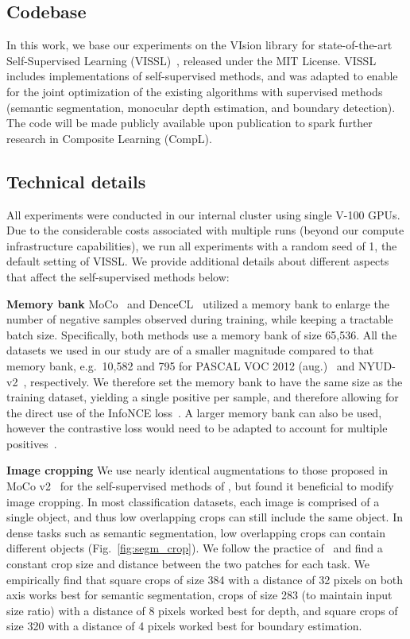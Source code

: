 \documentclass[10pt,twocolumn,letterpaper]{article}
\newcommand{\parsection}[1]{\vspace{1mm}\noindent\textbf{#1 }}
\begin{document}
\subsection{Codebase}
In this work, we base our experiments on the VIsion library for state-of-the-art Self-Supervised Learning (VISSL)~\cite{goyal2021vissl}, released under the MIT License. VISSL includes implementations of self-supervised methods, and was adapted to enable for the joint optimization of the existing algorithms with supervised methods (semantic segmentation, monocular depth estimation, and boundary detection). The code will be made publicly available upon publication to spark further research in Composite Learning (CompL). 

\subsection{Technical details}

All experiments were conducted in our internal cluster using single V-100 GPUs. Due to the considerable costs associated with multiple runs (beyond our compute infrastructure capabilities), we run all experiments with a random seed of 1, the default setting of VISSL. We provide additional details about different aspects that affect the self-supervised methods below:

\parsection{Memory bank}
MoCo~\cite{he2020momentum} and DenceCL~\cite{wang2020dense} utilized a memory bank to enlarge the number of negative samples observed during training, while keeping a tractable batch size. Specifically, both methods use a memory bank of size 65,536. All the datasets we used in our study are of a smaller magnitude compared to that memory bank, e.g.\ 10,582 and 795 for PASCAL VOC 2012 (aug.)~\cite{hariharan2011semantic} and NYUD-v2~\cite{silberman2012indoor}, respectively. We therefore set the memory bank to have the same size as the training dataset, yielding a single positive per sample, and therefore allowing for the direct use of the InfoNCE loss~\cite{oord2018representation}. A larger memory bank can also be used, however the contrastive loss would need to be adapted to account for multiple positives~\cite{khosla2020supervised}.

\parsection{Image cropping}
We use nearly identical augmentations to those proposed in MoCo v2~\cite{chen2020improved} for the self-supervised methods of \cite{he2020momentum,wang2020dense}, but found it beneficial to modify image cropping. In most classification datasets, each image is comprised of a single object, and thus low overlapping crops can still include the same object. In dense tasks such as semantic segmentation, low overlapping crops can contain different objects (Fig.~\ref{fig:segm_crop}). We follow the practice of~\cite{tian2020makes} and find a constant crop size and distance between the two patches for each task. We empirically find that square crops of size 384 with a distance of 32 pixels on both axis works best for semantic segmentation, crops of size 283 (to maintain input size ratio) with a distance of 8 pixels worked best for depth, and square crops of size 320 with a distance of 4 pixels worked best for boundary estimation. 
\end{document}
